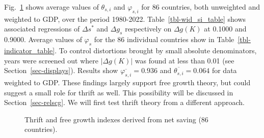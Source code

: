 \documentclass[a4paper,fleqn]{latex_styles/cas-sc}
\begin{document}
Fig.~\ref{fig-si_plots} shows average values of \(\theta_{s,i}\) and
\(\varphi_{s,i}\) for 86 countries, both unweighted and weighted to GDP,
over the period 1980-2022.
Table~\ref{tbl-wid_si_table} shows associated regressions of \(\Delta s^*\) and \(\Delta g_s\) respectively on \(\Delta g (K)\) at 0.1000 and 0.9000. Average values of \(\varphi_s\) for the 86 individual countries show in Table~\ref{tbl-indicator_table}.
To control distortions brought by small
absolute denominators, years were screened out where \(|\Delta g(K)|\)
was found at less than 0.01 (see Section~\ref{sec-displays}). Results show \(\overline{\varphi_{s,i}} = 0.936\) and \(\overline{\theta_{s,i}} = 0.064\) for data weighted to GDP. These findings largely support free growth theory, but could suggest a small role for thrift as well. This possibility will be discussed in Section~\ref{sec-relscg}. We will first test thrift theory from a different approach.
%
\FloatBarrier
\begin{figure}[pos=H]
    \centering
    \quad %
    \captionsetup{justification=centering}
    \caption{Thrift and free growth indexes derived from net saving (86 countries).}
    \label{fig-si_plots}
\end{figure}
\end{document}
